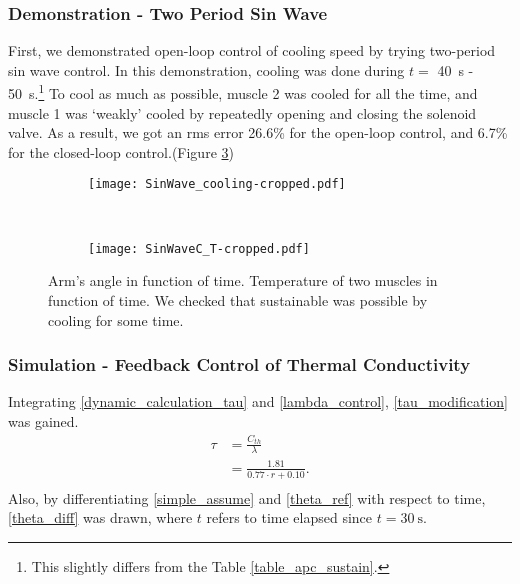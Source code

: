 \tocless \subsubsection{Demonstration - Two Period Sin Wave}
First, we demonstrated open-loop control of cooling speed by trying two-period sin wave control. In this demonstration, cooling was done during $t=$ \SI{40}{\second} - \SI{50}{\second}.\footnote{This slightly differs from the Table \ref{table_apc_sustain}.} To cool as much as possible, muscle 2 was cooled for all the time, and muscle 1 was `weakly' cooled by repeatedly opening and closing the solenoid valve. As a result, we got an rms error 26.6\% for the open-loop control, and 6.7\% for the closed-loop control.(Figure \ref{sustain_demo})

\begin{figure}[t]
	\centering
	\begin{subfigure}[t]{0.45\textwidth}
		\texttt{[image: SinWave\_cooling-cropped.pdf]}
		\caption{\label{SinWave_cooling}}
	\end{subfigure}
	~
	\begin{subfigure}[t]{0.44\textwidth}
		\texttt{[image: SinWaveC\_T-cropped.pdf]}
		\caption{\label{Sinwave_C_T}}
	\end{subfigure}
	\caption[Sustainable open-loop \apc demonstration.]{ Arm's angle in function of time.  Temperature of two muscles in function of time. We checked that sustainable \apc was possible by cooling for some time.}
	\label{sustain_demo}
\end{figure}

\tocless \subsubsection{Simulation - Feedback Control of Thermal Conductivity}


Integrating \eqref{dynamic_calculation_tau} and \eqref{lambda_control}, \eqref{tau_modification} was gained.
\begin{equation} \label{tau_modification} 
\begin{aligned} 
\tau & = \frac{C_{th}}{\lambda} \\
& = \frac{1.81}{0.77\cdot r + 0.10}. \\ 
\end{aligned}
\end{equation}
Also, by differentiating \eqref{simple_assume} and \eqref{theta_ref} with respect to time, \eqref{theta_diff} was drawn, where $t$ refers to time elapsed since $t=\SI{30}{\second}$.

